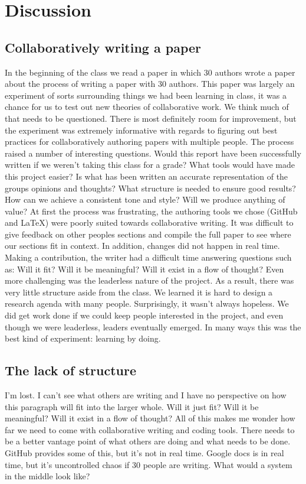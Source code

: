 \section{Discussion}
\subsection{Collaboratively writing a paper}
In the beginning of the class we read a paper \cite{tomlinson2012} in which 30 authors wrote a paper about the process of writing a paper with 30 authors. This paper was largely an experiment of sorts surrounding things we had been learning in class, it was a chance for us to test out new theories of collaborative work.
We think much of that needs to be questioned. There is most definitely room for improvement, but the experiment was extremely informative with regards to figuring out best practices for collaboratively authoring papers with multiple people.  
The process raised a number of interesting questions.
Would this report have been successfully written if we weren't taking this class for a grade?
What tools would have made this project easier? 
Is what has been written an accurate representation of the groups opinions and thoughts? 
What structure is needed to ensure good results?
How can we achieve a consistent tone and style? 
Will we produce anything of value?
At first the process was frustrating, the authoring tools we chose (GitHub and LaTeX) were poorly suited towards collaborative writing. It was difficult to give feedback on other peoples sections and compile the full paper to see where our sections fit in context. In addition, changes did not happen in real time. Making a contribution, the writer had a difficult time answering questions such as: Will it fit? Will it be meaningful? Will it exist in a flow of thought?
Even more challenging was the leaderless nature of the project. As a result, there was very little structure aside from the class. We learned it is hard to design a research agenda with many people. 
Surprisingly, it wasn't always hopeless. We did get work done if we could keep people interested in the project, and even though we were leaderless, leaders eventually emerged. In many ways this was the best kind of experiment: learning by doing.  


\subsection{The lack of structure}
I'm lost. I can't see what others are writing and I have no perspective on how this paragraph will fit into the larger whole. Will it just fit? Will it be meaningful? Will it exist in a flow of thought? All of this makes me wonder how far we need to come with collaborative writing and coding tools. There needs to be a better vantage point of what others are doing and what needs to be done. GitHub provides some of this, but it's not in real time. Google docs is in real time, but it's uncontrolled chaos if 30 people are writing. What would a system in the middle look like?

